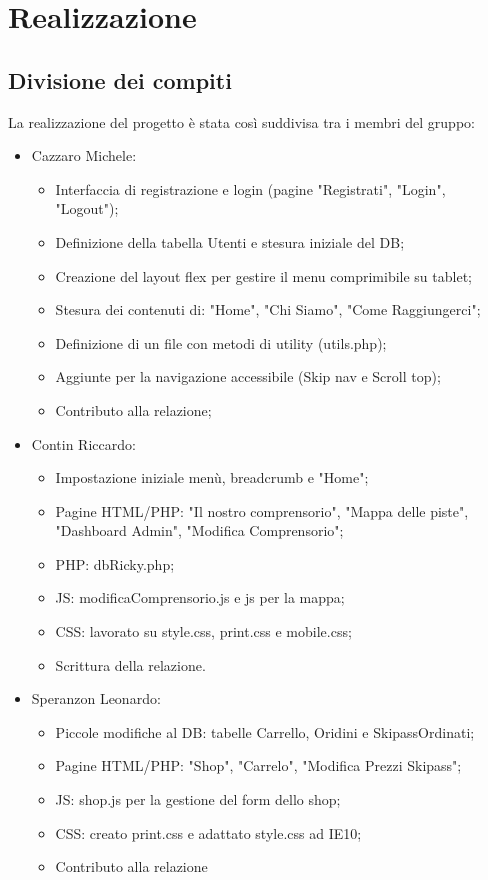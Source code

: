 \section{Realizzazione}

\subsection{Divisione dei compiti}

La realizzazione del progetto è stata così suddivisa tra i membri del gruppo:
\begin{itemize}
    \item Cazzaro Michele:
        \begin{itemize}
            \item Interfaccia di registrazione e login (pagine "Registrati", "Login", "Logout");
            \item Definizione della tabella Utenti e stesura iniziale del DB;
            \item Creazione del layout flex per gestire il menu comprimibile su tablet;
            \item Stesura dei contenuti di: "Home", "Chi Siamo", "Come Raggiungerci";
            \item Definizione di un file con metodi di utility (utils.php);
            \item Aggiunte per la navigazione accessibile (Skip nav e Scroll top);
            \item Contributo alla relazione;
        \end{itemize}
    \item Contin Riccardo:
        \begin{itemize}
            \item Impostazione iniziale menù, breadcrumb e "Home";
            \item Pagine HTML/PHP: "Il nostro comprensorio", "Mappa delle piste", "Dashboard Admin", "Modifica Comprensorio";
            \item PHP: dbRicky.php;
            \item JS: modificaComprensorio.js e js per la mappa;
            \item CSS: lavorato su style.css, print.css e mobile.css;
            \item Scrittura della relazione.
        \end{itemize}
    \item Speranzon Leonardo:
        \begin{itemize}
            \item Piccole modifiche al DB: tabelle Carrello, Oridini e SkipassOrdinati;
            \item Pagine HTML/PHP: "Shop", "Carrelo", "Modifica Prezzi Skipass";
            \item JS: shop.js per la gestione del form dello shop;
            \item CSS: creato print.css e adattato style.css ad IE10;
            \item Contributo alla relazione
        \end{itemize}
\end{itemize}

